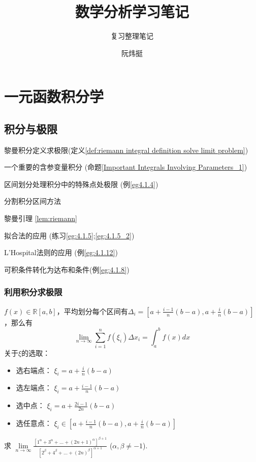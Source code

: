 \documentclass[lang=cn,newtx,10pt,scheme=chinese]{elegantbook}
\title{数学分析学习笔记}
\subtitle{复习整理笔记}
\author{阮炜挺}
\institute{宁波大学数学与统计学院}
\date{}
\begin{document}
\maketitle
\frontmatter

\tableofcontents

\mainmatter

\chapter{一元函数积分学}
\section{积分与极限}
\begin{introduction}
\item 黎曼积分定义求极限(定义\ref{def:riemann integral definition solve limit problem})
\item 一个重要的含参变量积分 (命题\ref{Important Integrals Involving Parameters_1})
\item 区间划分处理积分中的特殊点处极限 (例\ref{eg4.1.4})
\item 分割积分区间方法
\item 黎曼引理 \ref{lem:riemann}
\item 拟合法的应用 (练习\ref{eg:4.1.5};\ref{eg:4.1.5_2})
\item L'Hospital法则的应用 (例\ref{eg:4.1.12})
\item 可积条件转化为达布和条件(例\ref{eg:4.1.8})
\end{introduction}
\subsection{利用积分求极限}
\begin{definition}[基本原理]\label{def:riemann integral definition solve limit  problem}
    
    $f(x) \in \mathbb R [a,b]$，平均划分每个区间有$\Delta_i = [a+\frac{i-1}{n}(b-a),a+\frac{i}{n}(b-a)]$，那么有
    $$
    \lim_{n \to \infty} \sum_{i=1}^{n} f(\xi_i)\Delta x_i = \int_a^b f(x)dx
    $$
    关于$\xi$的选取：
    \begin{itemize}
        \item 选右端点： $\xi_i = a + \frac{i}{n}(b-a)$
        \item 选左端点： $\xi_i = a + \frac{i-1}{n}(b-a)$   
        \item 选中点： $\xi_i = a + \frac{2i-1}{2n}(b-a)$
        \item 选任意点： $\xi_i \in [a+\frac{i-1}{n}(b-a),a+\frac{i}{n}(b-a)]$
    \end{itemize}
\end{definition}
\begin{example}
求 $\lim\limits_{n \to \infty} \frac{[1^\alpha + 3^\alpha + \dots + (2n+1)^\alpha]^{\beta+1}}{[2^\beta + 4^\beta + \dots + (2n)^\beta]^{\alpha+1}}$ ($\alpha, \beta \neq -1$).
\end{example}
\end{document}
